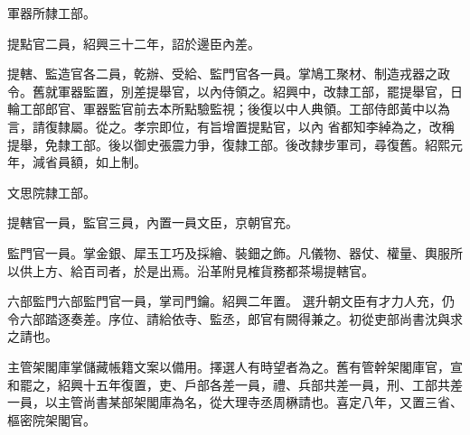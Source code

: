 \begin{pinyinscope}
 軍器所隸工部。



 提點官二員，紹興三十二年，詔於邊臣內差。



 提轄、監造官各二員，乾辦、受給、監門官各一員。掌鳩工聚材、制造戎器之政令。舊就軍器監置，別差提舉官，以內侍領之。紹興中，改隸工部，罷提舉官，日輪工部郎官、軍器監官前去本所點驗監視；後復以中人典領。工部侍郎黃中以為言，請復隸屬。從之。孝宗即位，有旨增置提點官，以內
 省都知李綽為之，改稱提舉，免隸工部。後以御史張震力爭，復隸工部。後改隸步軍司，尋復舊。紹熙元年，減省員額，如上制。



 文思院隸工部。



 提轄官一員，監官三員，內置一員文臣，京朝官充。



 監門官一員。掌金銀、犀玉工巧及採繪、裝鈿之飾。凡儀物、器仗、權量、輿服所以供上方、給百司者，於是出焉。沿革附見榷貨務都茶場提轄官。



 六部監門六部監門官一員，掌司門鑰。紹興二年置。
 選升朝文臣有才力人充，仍令六部踏逐奏差。序位、請給依寺、監丞，郎官有闕得兼之。初從吏部尚書沈與求之請也。



 主管架閣庫掌儲藏帳籍文案以備用。擇選人有時望者為之。舊有管幹架閣庫官，宣和罷之，紹興十五年復置，吏、戶部各差一員，禮、兵部共差一員，刑、工部共差一員，以主管尚書某部架閣庫為名，從大理寺丞周楙請也。喜定八年，又置三省、樞密院架閣官。



\end{pinyinscope}